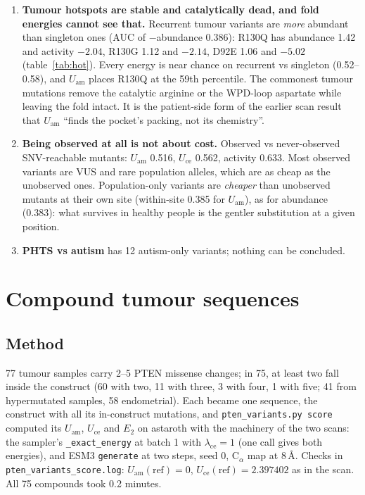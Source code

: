 \documentclass[11pt,a4paper]{article}
\newcommand{\file}[1]{\texttt{#1}}
\newcommand{\Uam}{U_{\mathrm{am}}}
\newcommand{\Uce}{U_{\mathrm{ce}}}
\newcommand{\Etwo}{E_{2}}
\begin{document}
\begin{enumerate}
  The two readings agree. $\Uam$, built on the attention map, carries residue
  identity and so ranks substitutions; $\Uce$, a cross-entropy of predicted
  structure tokens, asks how disturbed the local geometry is, which is mostly
  a property of the position.
\item \textbf{Tumour hotspots are stable and catalytically dead, and fold
  energies cannot see that.} Recurrent tumour variants are \emph{more}
  abundant than singleton ones (AUC of $-$abundance 0.386): R130Q has abundance
  1.42 and activity $-2.04$, R130G 1.12 and $-2.14$, D92E 1.06 and $-5.02$
  (table~\ref{tab:hot}). Every energy is near chance on recurrent vs singleton
  (0.52--0.58), and $\Uam$ places R130Q at the 59th percentile. The commonest
  tumour mutations remove the catalytic arginine or the WPD-loop aspartate
  while leaving the fold intact. It is the patient-side form of the earlier
  scan result that $\Uam$ ``finds the pocket's packing, not its chemistry''.
\item \textbf{Being observed at all is not about cost.} Observed vs
  never-observed SNV-reachable mutants: $\Uam$ 0.516, $\Uce$ 0.562, activity
  0.633. Most observed variants are VUS and rare population alleles, which
  are as cheap as the unobserved ones. Population-only variants are
  \emph{cheaper} than unobserved mutants at their own site (within-site 0.385
  for $\Uam$), as for abundance (0.383): what survives in healthy people is
  the gentler substitution at a given position.
\item \textbf{PHTS vs autism} has 12 autism-only variants; nothing can be
  concluded.
\end{enumerate}

\section{Compound tumour sequences}
\label{sec:compound}

\subsection{Method}

77 tumour samples carry 2--5 PTEN missense changes; in 75, at least two fall
inside the construct (60 with two, 11 with three, 3 with four, 1 with five; 41
from hypermutated samples, 58 endometrial). Each became one sequence, the
construct with all its in-construct mutations, and \file{pten\_variants.py
score} computed its $\Uam$, $\Uce$ and $\Etwo$ on astaroth with the machinery
of the two scans: the sampler's \texttt{\_exact\_energy} at batch 1 with
$\lambda_{\mathrm{ce}}=1$ (one call gives both energies), and ESM3
\texttt{generate} at two steps, seed 0, C$_\alpha$ map at 8\,\AA. Checks in
\file{pten\_variants\_score.log}: $\Uam(\mathrm{ref}) = 0$, $\Uce(\mathrm{ref})
= 2.397402$ as in the scan. All 75 compounds took 0.2 minutes.
\end{document}
